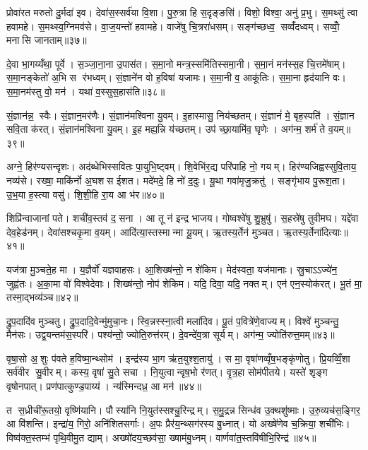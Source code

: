 प्रोवा॑रत मरुतो दु॒र्मदा॑ इव। देवा॑स॒स्सर्व॑या वि॒शा। पु॒रु॒त्रा हि स॒दृङ्ङसि॑। विशो॒ विश्वा॒ अनु॑ प्र॒भु। स॒मथ्सु॑ त्वा हवामहे। स॒मथ्स्व॒ग्निमव॑से। वा॒ज॒यन्तो॑ हवामहे। वाजे॑षु चि॒त्ररा॑धसम्। सङ्ग॑च्छध्व॒ सव्वँ॑दध्वम्। सव्वोँ॒ मनासि जानताम्॥३७॥

दे॒वा भा॒गय्यँथा॒ पूर्वे। स॒ञ्जा॒ना॒ना उ॒पास॑त। स॒मा॒नो मन्त्र॒स्समि॑तिस्समा॒नी। स॒मा॒नं मन॑स्स॒ह चि॒त्तमे॑षाम्। स॒मा॒नङ्केतो॑ अ॒भि स र॑भध्वम्। सं॒ज्ञाने॑न वो ह॒विषा॑ यजामः। स॒मा॒नी व॒ आकू॑तिः। स॒मा॒ना हृद॑यानि वः। स॒मा॒नम॑स्तु वो॒ मन॑। यथा॑ व॒स्सुस॒हास॑ति॥३८॥

सं॒ज्ञान॑न्न॒ स्वैः। सं॒ज्ञान॒मर॑णैः। सं॒ज्ञान॑मश्विना यु॒वम्। इ॒हास्मासु॒ निय॑च्छतम्। सं॒ज्ञानं॑ मे॒ बृह॒स्पति॑। सं॒ज्ञान सवि॒ता क॑रत्। सं॒ज्ञान॑मश्विना यु॒वम्। इ॒ह मह्य॒न्नि य॑च्छतम्। उप॑ च्छा॒यामि॑व॒ घृणेः। अग॑न्म॒ शर्म॑ ते व॒यम्॥३९॥

अग्ने॒ हिर॑ण्यसन्दृशः। अद॑ब्धेभिस्सवितः पा॒युभि॒ष्ट्वम्। शि॒वेभि॑र॒द्य परि॑पाहि नो॒ गयम्। हिर॑ण्यजिह्वस्सुवि॒ताय॒ नव्य॑से। रख्षा॒ माकि॑र्नो अ॒घशस ईशत। मदे॑मदे॒ हि नो॑ द॒दुः। यू॒था गवा॑मृजु॒क्रतु॑। सङ्गृ॑भाय पु॒रूश॒ता। उ॒भ॒या ह॒स्त्या वसु॑। शि॒शी॒हि रा॒य आ भ॑र॥४०॥

शिप्रि॑न्वाजानां पते। शची॑व॒स्तव॑ द॒सना। आ तू न॑ इन्द्र भाजय। गोष्वश्वे॑षु शु॒भ्रुषु॑। स॒हस्रे॑षु तुवीमघ। यद्दे॑वा देव॒हेड॑नम्। देवा॑सश्चकृ॒मा व॒यम्। आदि॑त्या॒स्तस्मान्मा यू॒यम्। ऋ॒तस्य॒र्तेन॑ मुञ्चत। ऋ॒तस्य॒र्तेना॑दित्याः॥४१॥

यज॑त्रा मु॒ञ्चते॒ह मा। य॒ज्ञैर्वो॑ यज्ञवाहसः। आ॒शिख्ष॑न्तो॒ न शे॑किम। मेद॑स्वता॒ यज॑मानाः। स्रु॒चाऽऽज्ये॑न॒ जुह्व॑तः। अ॒का॒मा वो॑ विश्वेदेवाः। शिख्ष॑न्तो॒ नोप॑ शेकिम। यदि॒ दिवा॒ यदि॒ नक्तम्। एन॑ एन॒स्योक॑रत्। भू॒तं मा॒ तस्मा॒द्भव्य॑ञ्च॥४२॥

द्रु॒प॒दादि॑व मुञ्चतु। द्रु॒प॒दादि॒वेन्मु॑मुचा॒नः। स्वि॒न्नस्स्ना॒त्वी मला॑दिव। पू॒तं प॒वित्रे॑णे॒वाज्यम्। विश्वे॑ मुञ्चन्तु॒ मैन॑सः। उद्व॒यन्तम॑स॒स्परि॑। पश्य॑न्तो॒ ज्योति॒रुत्त॑रम्। दे॒वन्दे॑व॒त्रा सूर्यम्। अग॑न्म॒ ज्योति॑रुत्त॒मम्॥४३॥\anuvakamend[तव॑ कृधि॒ वन॒स्पतीञ्जानता॒मस॑ति व॒यं भ॑रादित्याश्च॒ नव॑ च]

वृषा॒सो अ॒शुः प॑वते ह॒विष्मा॒न्थ्सोम॑। इन्द्र॑स्य भा॒ग ऋ॑त॒युश्श॒तायु॑। स मा॒ वृषा॑णव्वृँष॒भङ्कृ॑णोतु। प्रि॒यव्विँ॒शा सर्व॑वीर सु॒वीरम्। कस्य॒ वृषा॑ सु॒ते सचा। नि॒युत्वान्वृष॒भो र॑णत्। वृ॒त्र॒हा सोम॑पीतये। यस्ते॑ शृङ्ग वृषोनपात्। प्रण॑पात्कुण्ड॒पाय्य॑। न्य॑स्मिन्दध्र॒ आ मन॑॥४४॥

त स॒ध्रीची॑रू॒तयो॒ वृष्णि॑यानि। पौस्या॑नि नि॒युत॑स्सश्चु॒रिन्द्रम्। स॒मु॒द्रन्न सिन्ध॑व उ॒क्थशु॑ष्माः। उ॒रु॒व्यच॑स॒ङ्गिर॒ आ वि॑शन्ति। इन्द्रा॑य॒ गिरो॒ अनि॑शितसर्गाः। अ॒पः प्रैर॑य॒न्थ्सग॑रस्य बु॒ध्नात्। यो अख्षे॑णेव च॒क्रिया॒ शची॑भिः। विष्व॑क्त॒स्तम्भ॑ पृथि॒वीमु॒त द्याम्। अख्षो॑दय॒च्छव॑सा॒ ख्षाम॑बु॒ध्नम्। वार्णवा॑त॒स्तवि॑षीभि॒रिन्द्र॑॥४५॥

